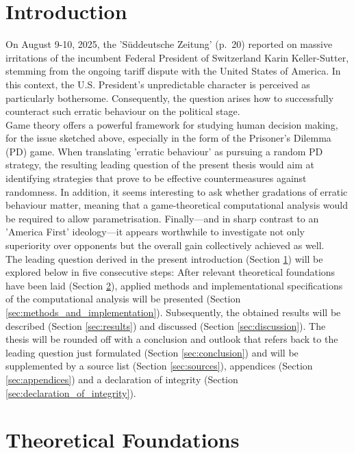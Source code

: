 \documentclass[11pt]{article}
\begin{document}
\newpage

\tableofcontents
\newpage

\section{Introduction} \label{sec:intro}
On August 9-10, 2025, the 'Süddeutsche Zeitung' (p.~20) reported on massive irritations of the incumbent Federal President of Switzerland Karin Keller-Sutter, stemming from the ongoing tariff dispute with the United States of America.
In this context, the U.S. President's unpredictable character is perceived as particularly bothersome.
Consequently, the question arises how to successfully counteract such erratic behaviour on the political stage.\\
\indent Game theory offers a powerful framework for studying human decision making, for the issue sketched above, especially in the form of the Prisoner's Dilemma (PD) game.
When translating 'erratic behaviour' as pursuing a random PD strategy, the resulting leading question of the present thesis would aim at identifying strategies that prove to be effective countermeasures against randomness.
In addition, it seems interesting to ask whether gradations of erratic behaviour matter, meaning that a game-theoretical computational analysis would be required to allow parametrisation.
Finally---and in sharp contrast to an 'America First' ideology---it appears worthwhile to investigate not only superiority over opponents but the overall gain collectively achieved as well.\\
\indent The leading question derived in the present introduction (Section \ref{sec:intro}) will be explored below in five consecutive steps: After relevant theoretical foundations have been laid (Section \ref{sec:theoretical_found}), applied methods and implementational specifications of the computational analysis will be presented (Section \ref{sec:methods_and_implementation}).
Subsequently, the obtained results will be described (Section \ref{sec:results}) and discussed (Section \ref{sec:discussion}). 
The thesis will be rounded off with a conclusion and outlook that refers back to the leading question just formulated (Section \ref{sec:conclusion}) and will be supplemented by a source list (Section \ref{sec:sources}), appendices (Section \ref{sec:appendices}) and a declaration of integrity (Section \ref{sec:declaration_of_integrity}).

\section{Theoretical Foundations} \label{sec:theoretical_found}
\end{document}
